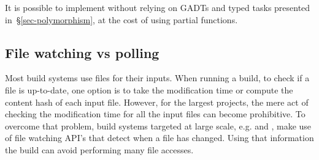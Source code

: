 \noindent
It is possible to implement  without relying on GADTs and typed
tasks presented in~\S\ref{sec-polymorphism}, at the cost of using partial
functions.

\subsection{File watching vs polling}\label{sec-integration-with-ides}

Most build systems use files for their inputs. When running a build, to check if a file is up-to-date, one option is to take the modification time or compute the content hash of each input file. However, for the largest projects, the mere act of checking the modification time for all the input files can become prohibitive. To overcome that problem, build systems targeted at large scale, e.g. \Bazel and \Buck, make use of file watching API's that detect when a file has changed. Using that information the build can avoid performing many file accesses.
